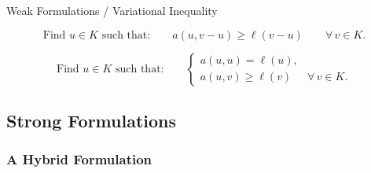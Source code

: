 \documentclass[10pt,aspectratio=169]{beamer}
\begin{document}
\begin{frame}{Weak Formulations / Variational Inequality}
	\vfill
	\begin{problem}
	\begin{equation*}
		\text{Find }u\in K\text{ such that:}\qquad a(u,v-u)\ge \ell(v-u)\qquad \forall\, v\in K.
	\end{equation*}
	\end{problem}
	\vfill
	\begin{problem}
	\begin{equation*}
		\text{Find }u\in K\text{ such that:}\qquad
		\begin{cases}
			a(u,u) = \ell(u), &                   \\[2pt]
			a(u,v)\ge \ell(v) & \forall\, v\in K.
		\end{cases}
	\end{equation*}
	\end{problem}
	\vfill
\end{frame}

\subsection{Strong Formulations}

\subsubsection{A Hybrid Formulation}
\end{document}
